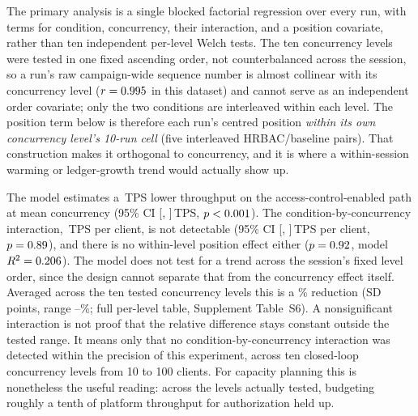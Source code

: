\documentclass[a4paper,fleqn]{cas-sc}
\begin{document}
The primary analysis is a single blocked factorial regression over every
run, with terms for condition, concurrency, their interaction, and a
position covariate, rather than ten independent per-level Welch tests. The
ten concurrency levels were tested in one fixed ascending order, not
counterbalanced across the session, so a run's raw campaign-wide sequence
number is almost collinear with its concurrency level
($r=0.995$ in this dataset) and cannot serve as an
independent order covariate; only the two conditions are interleaved within
each level. The position term below is therefore each run's centred
position \emph{within its own concurrency level's 10-run cell} (five
interleaved HRBAC/baseline pairs). That construction makes it orthogonal to
concurrency, and it is where a within-session warming or ledger-growth
trend would actually show up.

The model estimates a \ThrCondCoef\,TPS lower throughput on the
access-control-enabled path at mean concurrency (95\% CI
[\ThrCondCoefCILow, \ThrCondCoefCIHigh]\,TPS, $p<0.001$). The
condition-by-concurrency interaction, \ThrInteractCoef\,TPS per client, is
not detectable (95\% CI [\ThrInteractCILow, \ThrInteractCIHigh]\,TPS per
client, $p=0.89$), and there is no within-level position effect
either ($p=0.92$, model $R^2=0.206$). The model does
not test for a trend across the session's fixed level order, since the
design cannot separate that from the concurrency effect itself. Averaged
across the ten tested concurrency levels this is a \OverheadMeanPct\%
reduction (SD \OverheadSDPct{} points, range
\OverheadMinPct--\OverheadMaxPct\%; full per-level table, Supplement
Table~S6). A nonsignificant interaction is not proof that the relative
difference stays constant outside the tested range. It means only that no
condition-by-concurrency interaction was detected within the precision of
this experiment, across ten closed-loop concurrency levels from 10 to 100
clients. For capacity planning this is nonetheless the useful reading:
across the levels actually tested, budgeting roughly a tenth of platform
throughput for authorization held up.
\end{document}
